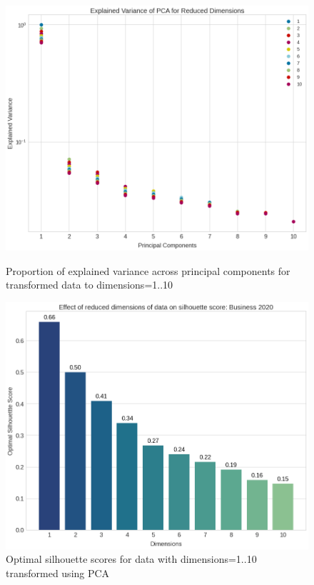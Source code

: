 \vspace{-2ex}
\begin{figure}[H]
  \centering
    \begin{minipage}[t]{.49\textwidth}
      \centering
      \includegraphics[width=\textwidth]{images/eval/explained_variances.png}
      \caption{Proportion of explained variance across principal components for transformed data to dimensions=1..10}
      \label{fig:explained_variance}
    \end{minipage}
    \begin{minipage}[t]{.49\textwidth}
      \centering
      \includegraphics[width=\textwidth]{images/eval/pca_silhouette.png}
      \caption{Optimal silhouette scores for data with dimensions=1..10 transformed using PCA }
      \label{fig:pca_sil}
    \end{minipage}
  \end{figure}


